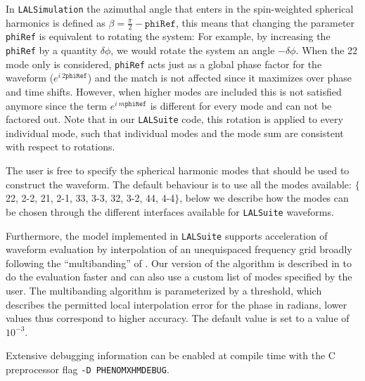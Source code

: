 \documentclass[twocolumn,prd,aps,superscriptaddress,preprintnumbers,tightenlines,showpacs,nofootinbib,eqsecnum,amsfonts,amsmath]{revtex4}
\begin{document}
In \texttt{LALSimulation} the azimuthal angle that enters in the spin-weighted spherical harmonics is defined as $\beta = \frac{\pi}{2} - \texttt{phiRef}$, this means that changing the parameter \texttt{phiRef} is equivalent to rotating the system: For example, by increasing the \texttt{phiRef}  by a quantity $\delta \phi$, we would rotate the system an angle $-\delta \phi$. When the 22 mode only is considered, \texttt{phiRef} acts just as a global phase factor for the waveform ($e^{i \: 2 \texttt{phiRef}}$) and the match is not affected since it maximizes over phase and time shifts. However, when higher modes are included this is not satisfied anymore since the term $e^{i \: m \texttt{phiRef}}$ is different for every mode and can not be factored out.
Note that in our \texttt{LALSuite} code, this rotation is applied to every individual mode, such that individual modes and the mode sum are consistent with respect to rotations.



The user is free to specify the spherical harmonic modes that should be used to construct the waveform. The default behaviour is to use
all the modes available: $\{$22, 2-2, 21, 2-1, 33, 3-3, 32, 3-2, 44, 4-4$\}$,
below we describe how the modes can be chosen through the different interfaces available for \texttt{LALSuite} waveforms.

Furthermore, the model implemented in \texttt{LALSuite} supports acceleration of waveform evaluation by interpolation of an unequispaced frequency grid broadly following the ``multibanding'' of \cite{Vinciguerra:2017ngf}. Our version of the algorithm is described in 
\cite{our_mb} to do the evaluation faster and can also use a custom list of modes specified by the user.
The multibanding algorithm is parameterized by a threshold, which describes the permitted local interpolation error for the phase in radians, lower values 
thus correspond to higher accuracy.
The default value is set to a value of $10^{-3}$.  

Extensive debugging information can be enabled at compile time with the C preprocessor flag {\tt -D PHENOMXHMDEBUG}.
\end{document}
